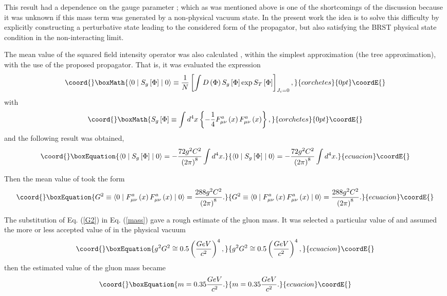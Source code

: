\documentclass[12pt,letterpaper]{report}
\begin{document}
This result had a dependence on the gauge parameter \myHighlight{$\alpha$}\coordHE{};
which as was mentioned above is one of the shortcomings of the
discussion \cite{Cabo} because it was unknown if this mass term
was generated by a non-physical vacuum state. In the present work
the idea is to solve this difficulty by explicitly constructing a
perturbative state leading to the considered form of the
propagator, but also satisfying the BRST physical state condition
in the non-interacting limit.

The mean value of the squared field intensity operator was also
calculated \cite{Cabo}, within the simplest approximation (the
tree approximation), with the use of the proposed propagator. That
is, it was evaluated the expression
\[\coord{}\boxMath{
\langle 0\mid S_g\left[ \Phi \right] \mid 0\rangle \equiv \frac
1N\left[ \int D\left(\Phi \right) S_g\left[ \Phi \right] \exp
S_T\left[ \Phi \right] \right] _{J_i=0},
}{corchetes}{0pt}\coordE{}\]
with
\[\coord{}\boxMath{
S_g\left[ \Phi \right] \equiv \int d^4x\left\{ -\frac 14F_{\mu \nu
}^a\left(x\right) F_{\mu \nu }^a\left(x\right) \right\},
}{corchetes}{0pt}\coordE{}\]
and the following result was obtained,
\begin{equation}\coord{}\boxEquation{
\langle 0\mid S_g\left[ \Phi \right] \mid 0\rangle
=-\frac{72g^2C^2}{\left(2\pi \right) ^8}\int d^4x.
}{
\langle 0\mid S_g\left[ \Phi \right] \mid 0\rangle
=-\frac{72g^2C^2}{\left(2\pi \right) ^8}\int d^4x.
}{ecuacion}\coordE{}\end{equation}

Then the mean value of \coordHE{} took the form
\begin{equation}\coord{}\boxEquation{
G^2\equiv \langle 0\mid F_{\mu \nu }^a\left(x\right) F_{\mu \nu
}^a\left(x\right) \mid 0\rangle =\frac{288g^2C^2}{\left(2\pi
\right) ^8}. \label{G2}
}{
G^2\equiv \langle 0\mid F_{\mu \nu }^a\left(x\right) F_{\mu \nu
}^a\left(x\right) \mid 0\rangle =\frac{288g^2C^2}{\left(2\pi
\right) ^8}. }{ecuacion}\coordE{}\end{equation}

The substitution of Eq. (\ref{G2}) in Eq. (\ref{mass}) gave a
rough estimate of the gluon mass. It was selected a particular
value of \coordHE{} and assumed the more or less accepted value
of \coordHE{} in the physical vacuum
\begin{equation}\coord{}\boxEquation{
g^2G^2\cong 0.5\left(\frac{GeV}{c^2}\right) ^4,
}{
g^2G^2\cong 0.5\left(\frac{GeV}{c^2}\right) ^4,
}{ecuacion}\coordE{}\end{equation}
then the estimated value of the gluon mass became
\begin{equation}\coord{}\boxEquation{
m=0.35\frac{GeV}{c^2}.
}{
m=0.35\frac{GeV}{c^2}.
}{ecuacion}\coordE{}\end{equation}
\end{document}
